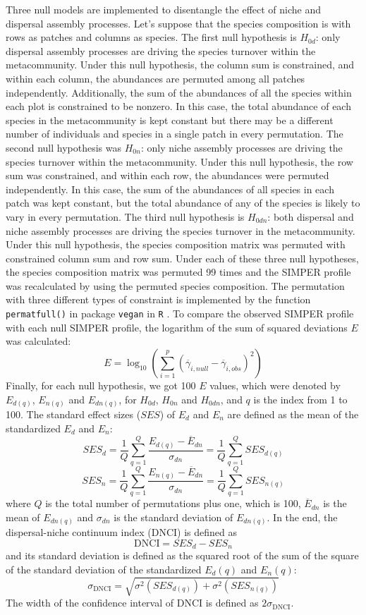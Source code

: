 	Three null models are implemented to disentangle the effect of niche and dispersal assembly processes. Let's suppose that the species composition is with rows as patches and columns as species. The first null hypothesis is $H_{0d}$: only dispersal assembly processes are driving the species turnover within the metacommunity. Under this null hypothesis, the column sum is constrained, and within each column, the abundances are permuted among all patches independently. Additionally, the sum of the abundances of all the species within each plot is constrained to be nonzero. In this case, the total abundance of each species in the metacommunity is kept constant but there may be a different number of individuals and species in a single patch in every permutation. The second null hypothesis was $H_{0n}$: only niche assembly processes are driving the species turnover within the metacommunity. Under this null hypothesis, the row sum was constrained, and within each row, the abundances were permuted independently. In this case, the sum of the abundances of all species in each patch was kept constant, but the total abundance of any of the species is likely to vary in every permutation. The third null hypothesis is $H_{0dn}$: both dispersal and niche assembly processes are driving the species turnover in the metacommunity. Under this null hypothesis, the species composition matrix was permuted with constrained column sum and row sum. Under each of these three null hypotheses, the species composition matrix was permuted 99 times and the SIMPER profile was recalculated by using the permuted species composition. The permutation with three different types of constraint is implemented by the function \texttt{permatfull()} in package \texttt{vegan} in \texttt{R} \citep{R}. To compare the observed SIMPER profile with each null SIMPER profile, the logarithm of the sum of squared deviations $E$ was calculated: 
	\[
	E = \log_{10}(\sum_{i=1}^p(\overline{\gamma}_{i,null} - \overline{\gamma}_{i,obs})^2)
	\]
	Finally, for each null hypothesis, we got 100 $E$ values, which were denoted by $E_{d(q)}$, $E_{n(q)}$ and $E_{dn(q)}$, for $H_{0d}$, $H_{0n}$ and $H_{0dn}$, and $q$ is the index from 1 to 100. The standard effect sizes ($SES$) of $E_d$ and $E_n$ are defined as the mean of the standardized $E_d$ and $E_n$:
	\[
	SES_d = \frac{1}{Q}\sum_{q=1}^Q \dfrac{E_{d(q)} - \overline{E}_{dn}}{\sigma_{dn}} = \frac{1}{Q}\sum_{q=1}^Q SES_{d(q)}
	\]
	\[
	SES_n = \frac{1}{Q}\sum_{q=1}^Q \dfrac{E_{n(q)} - \overline{E}_{dn}}{\sigma_{dn}} = \frac{1}{Q}\sum_{q=1}^Q SES_{n(q)}
	\]
	where $Q$ is the total number of permutations plus one, which is 100, $\overline{E}_{dn}$ is the mean of $E_{dn(q)}$ and $\sigma_{dn}$ is the standard deviation of $E_{dn(q)}$. In the end, the dispersal-niche continuum index (DNCI) is defined as
	\[
	\text{DNCI} = SES_d - SES_n
	\]
	and its standard deviation is defined as the squared root of the sum of the square of the standard deviation of the standardized $E_d(q)$ and $E_n(q)$:
	\[
	\sigma_{\text{DNCI}} = \sqrt{\sigma^2(SES_{d(q)}) + \sigma^2(SES_{n(q)})}
	\]
	The width of the confidence interval of DNCI is defined as $2\sigma_{\text{DNCI}}$.
	

